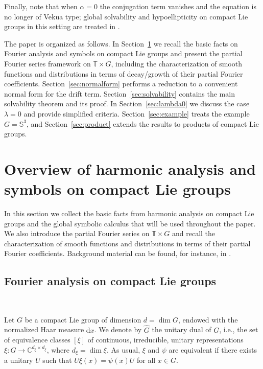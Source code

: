 \documentclass[11pt,reqno]{amsart}
\numberwithin{equation}{section}
\begin{document}
Finally, note that when $\alpha=0$ the conjugation term vanishes and the equation is no longer of Vekua type; global solvability and hypoellipticity on compact Lie groups in this setting are treated in \cite{KMR20b,KPM21_jde,KKM24_mana}.


The paper is organized as follows. In Section~\ref{sec:Overview} we recall the basic facts on Fourier analysis and symbols on compact Lie groups and present the partial Fourier series framework on $\mathbb{T}\times G$, including the characterization of smooth functions and distributions in terms of decay/growth of their partial Fourier coefficients. Section~\ref{sec:normalform} performs a reduction to a convenient normal form for the drift term. Section~\ref{sec:solvability} contains the main solvability theorem and its proof. In Section~\ref{sec:lambda0} we discuss the case $\lambda=0$ and provide simplified criteria. Section~\ref{sec:example} treats the example $G=\mathbb{S}^3$, and Section~\ref{sec:product} extends the results to products of compact Lie groups.



	
	\section{Overview of harmonic analysis and symbols on compact Lie groups}\label{sec:Overview}
	
	In this section we collect the basic facts from harmonic analysis on compact Lie groups and the global symbolic calculus that will be used throughout the paper. We also introduce the partial Fourier series on $\mathbb{T}\times G$ and recall the characterization of smooth functions and distributions in terms of their partial Fourier coefficients. Background material can be found, for instance, in \cite{livropseudo,KMR20}.
	
	\subsection{Fourier analysis on compact Lie groups}\label{subsec:fourier_on_G} \
	
	Let $G$ be a compact Lie group of dimension $d=\dim G$, endowed with the normalized Haar measure $\mathrm{d}x$.
	We denote by $\widehat{G}$ the unitary dual of $G$, i.e., the set of equivalence classes $[\xi]$ of continuous, irreducible, unitary representations $\xi:G\to \mathbb{C}^{d_\xi\times d_\xi}$, where $d_\xi=\dim\xi$. As usual, $\xi$ and $\psi$ are equivalent if there exists a unitary $U$ such that $U\xi(x)=\psi(x)U$ for all $x\in G$.
	
\end{document}
